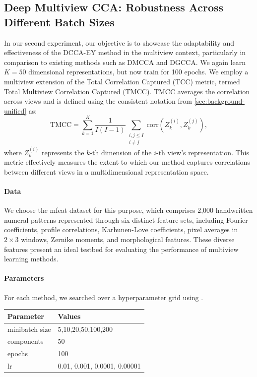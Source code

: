 \subsection{Deep Multiview CCA: Robustness Across Different Batch Sizes}
In our second experiment, our objective is to showcase the adaptability and effectiveness of the DCCA-EY method in the multiview context, particularly in comparison to existing methods such as DMCCA and DGCCA.
We again learn $K=50$ dimensional representations, but now train for 100 epochs.
We employ a multiview extension of the Total Correlation Captured (TCC) metric, termed Total Multiview Correlation Captured (TMCC). TMCC averages the correlation across views and is defined using the consistent notation from \cref{sec:background-unified} as:
\[
    \text{TMCC} = \sum_{k=1}^{K} \frac{1}{I(I-1)} \sum_{\substack{i,j \leq I \\ i \neq j}} \text{corr}(Z_k^{(i)}, Z_k^{(j)}),
\]
where \( Z_k^{(i)} \) represents the \( k \)-th dimension of the \( i \)-th view's representation.
This metric effectively measures the extent to which our method captures correlations between different views in a multidimensional representation space.

\paragraph{Data} We choose the mfeat dataset for this purpose, which comprises 2,000 handwritten numeral patterns represented through six distinct feature sets, including Fourier coefficients, profile correlations, Karhunen-Love coefficients, pixel averages in \(2 \times 3\) windows, Zernike moments, and morphological features.
These diverse features present an ideal testbed for evaluating the performance of multiview learning methods.

\paragraph{Parameters} For each method, we searched over a hyperparameter grid using \citet{wandb}.

\begin{table}[h!]
    \centering
    \begin{tabular}{|l|l|}
        \hline Parameter      & Values                       \\
        \hline minibatch size & 5,10,20,50,100,200           \\
        \hline components     & 50                           \\
        \hline epochs         & 100                          \\
        \hline lr             & 0.01, 0.001, 0.0001, 0.00001 \\
        \hline
    \end{tabular}
\end{table}

